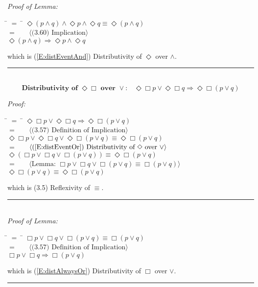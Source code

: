 \documentclass[fleqn, leqno]{article}
\newcommand{\lgap}{2pt}                             %
\newcommand{\mymathindent}{24pt}                    %
\newcommand{\Event}{\Diamond}
\newcommand{\Always}{\Box}
\newcommand{\myqed}{\hfill\rule[-.23ex]{1.2ex}{2.0ex}}
\newcommand{\Gll} {\langle}                         %
\newcommand{\Ggg} {\rangle}                         %
\newcommand{\Hint}[1]     {\ \ \ $\Gll              \mbox{#1} \Ggg$ }   %
\begin{document}
\emph{Proof of Lemma:}
\begin{tabbing}
\hspace{\mymathindent} \= $= \;$ \= \kill
  \> \>   $\Event(p \land q) \land \Event p \land \Event q \equiv \Event(p \land q)$\\[\lgap]
  \> $=$  \>  \Hint{(3.60) Implication}\\[\lgap]
  \> \>   $\Event(p \land q) \Rightarrow \Event p \land \Event q$\\[\lgap]
\end{tabbing}
which is (\ref{E:distEventAnd}) Distributivity of $\Event$ over $\land$. \myqed\\[\lgap]


\begin{equation}\label{E:distEventAlwaysOr}
\textbf{Distributivity of $\Event\Always$ over $\lor$:}\quad \Event\Always p \lor \Event\Always q \Rightarrow \Event\Always (p \lor q)
\end{equation}

\emph{Proof:}
\begin{tabbing}
\hspace{\mymathindent} \= $= \;$ \= \kill
  \> \>   $\Event\Always p \lor \Event\Always q \Rightarrow \Event\Always(p \lor q)$\\[\lgap]
  \> $=$  \>  \Hint{(3.57) Definition of Implication}\\[\lgap]
  \> \>   $\Event\Always p \lor \Event\Always q \lor \Event\Always(p \lor q) \equiv \Event\Always(p \lor q)$\\[\lgap]
  \> $=$  \>  \Hint{(\ref{E:distEventOr}) Distributivity of $\Event$ over $\lor$}\\[\lgap]
  \> \>   $\Event(\Always p \lor \Always q \lor \Always(p \lor q)) \equiv \Event\Always(p \lor q)$\\[\lgap]
  \> $=$  \>  \Hint{Lemma: $\Always p \lor \Always q \lor \Always(p \lor q) \equiv \Always(p \lor q)$}\\[\lgap]
  \> \>   $\Event\Always(p \lor q) \equiv \Event\Always(p \lor q)$\\[\lgap]
\end{tabbing}
which is (3.5) Reflexivity of $\equiv$. \myqed\\[\lgap]

\emph{Proof of Lemma:}
\begin{tabbing}
\hspace{\mymathindent} \= $= \;$ \= \kill
  \> \>   $\Always p \lor \Always q \lor \Always(p \lor q) \equiv \Always(p \lor q)$\\[\lgap]
  \> $=$  \>  \Hint{(3.57) Definition of Implication}\\[\lgap]
  \> \>   $\Always p \lor \Always q \Rightarrow \Always(p \lor q)$\\[\lgap]
\end{tabbing}
which is (\ref{E:distAlwaysOr}) Distributivity of $\Always$ over $\lor$. \myqed\\[\lgap]
\end{document}

